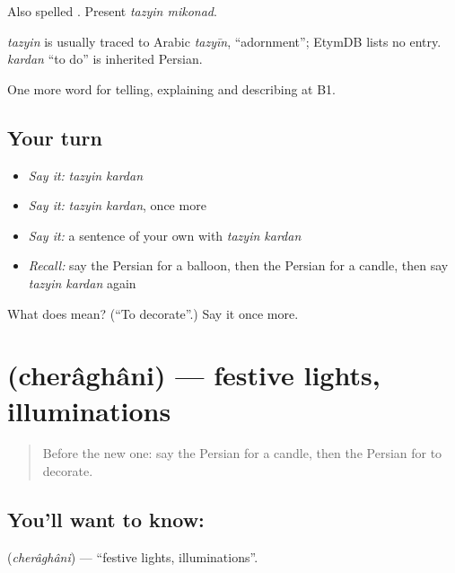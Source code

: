 Also spelled . Present \emph{tazyin mikonad}.

\begin{cousinweb}
\emph{tazyin} is usually traced to Arabic \emph{tazyīn}, \textquotedblleft{}adornment\textquotedblright{}; EtymDB lists no entry. \emph{kardan} \textquotedblleft{}to do\textquotedblright{} is inherited Persian.
\end{cousinweb}

\begin{grammarlens}[title={What you've built}]
One more word for telling, explaining and describing at B1.
\end{grammarlens}

\subsection*{Your turn}
\begin{itemize}
\raggedright
  \item \emph{Say it:} \emph{tazyin kardan}
  \item \emph{Say it:} \emph{tazyin kardan}, once more
  \item \emph{Say it:} a sentence of your own with \emph{tazyin kardan}
  \item \emph{Recall:} say the Persian for a balloon, then the Persian for a candle, then say \emph{tazyin kardan} again
\end{itemize}

\begin{tcolorbox}[breakable,colback=teal!4,colframe=teal!35!black,title={Before you move on}]
What does   mean? (\textquotedblleft{}To decorate\textquotedblright{}.) Say it once more.
\end{tcolorbox}
\section[\texorpdfstring{\fa{چراغانی} (cherâghâni)}{چراغانی (cherâghâni)}]{ (cherâghâni) — festive lights, illuminations}

\label{lesson:FA-C342-cheraghani}



\begin{quote}
Before the new one: say the Persian for a candle, then the Persian for to decorate.
\end{quote}

\subsection*{You'll want to know: }
\textbf{} (\emph{cherâghâni}) — \textquotedblleft{}festive lights, illuminations\textquotedblright{}.

